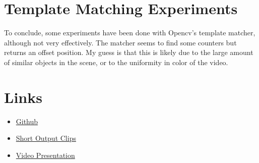 \documentclass[conference]{IEEEtran}
\begin{document}

\section{Template Matching Experiments}

To conclude, some experiments have been done with Opencv's template matcher, although not very effectively. 
The matcher seems to find some counters but returns an offset position. My guess is that this is 
likely due to the large amount of similar objects in the scene, or to the uniformity in color of the video. 


\section{Links}

\begin{itemize}
    \item \href{https://github.com/lelepado01/Assignment2ComputerVision}{Github} 
    \item \href{https://drive.google.com/file/d/1OssPwOR97STaiHRiAeliSH2cpHP-4XCJ/view?usp=sharing}{Short Output Clips} 
    \item \href{https://drive.google.com/file/d/1r-y5-ALC4fAHzOlGfd5zgIg0w363ghtm/view?usp=sharing}{Video Presentation} 
\end{itemize}



\end{document}
